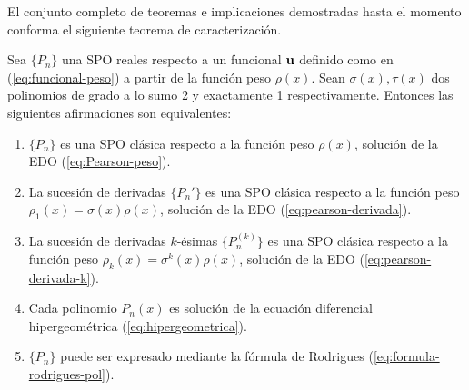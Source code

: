 El conjunto completo de teoremas e implicaciones demostradas hasta el momento conforma el siguiente teorema de caracterización.

\begin{teorema}
    Sea $\{P_n\}$ una SPO reales respecto a un funcional $\mathbf{u}$ definido como en (\ref{eq:funcional-peso}) a partir de la función peso $\rho(x)$. Sean $\sigma(x), \tau(x)$ dos polinomios de grado a lo sumo 2 y exactamente 1 respectivamente. Entonces las siguientes afirmaciones son equivalentes:
    \begin{enumerate}
        \item $\{P_n\}$ es una SPO clásica respecto a la función peso $\rho(x)$, solución de la EDO (\ref{eq:Pearson-peso}).
        \item La sucesión de derivadas $\{P_n'\}$ es una SPO clásica respecto a la función peso $\rho_1(x)=\sigma(x)\rho(x)$, solución de la EDO (\ref{eq:pearson-derivada}).
        \item La sucesión de derivadas $k$-ésimas $\{P_n^{(k)}\}$ es una SPO clásica respecto a la función peso $\rho_k(x)=\sigma^k(x)\rho(x)$, solución de la EDO (\ref{eq:pearson-derivada-k}).
        \item Cada polinomio $P_n(x)$ es solución de la ecuación diferencial hipergeométrica (\ref{eq:hipergeometrica}).
        \item $\{P_n\}$ puede ser expresado mediante la fórmula de Rodrigues (\ref{eq:formula-rodrigues-pol}).
    \end{enumerate} 
\end{teorema}
